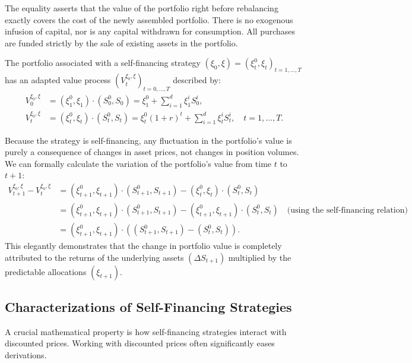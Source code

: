 The equality asserts that the value of the portfolio right before rebalancing exactly covers the cost of the newly assembled portfolio. There is no exogenous infusion of capital, nor is any capital withdrawn for consumption. All purchases are funded strictly by the sale of existing assets in the portfolio.

\begin{definition}
The portfolio associated with a self-financing strategy $(\xi_0, \xi) = (\xi_t^0, \xi_t)_{t=1, \dots, T}$ has an adapted value process $(V_t^{\xi_0, \xi})_{t=0, \dots, T}$ described by:
\begin{align*}
V_0^{\xi_0, \xi} &= \left(\xi_1^0, \xi_1\right) \cdot \left(S_0^0, S_0\right) = \xi_1^0 + \sum_{i=1}^d \xi_1^i S_0^i, \\
V_t^{\xi_0, \xi} &= \left(\xi_t^0, \xi_t\right) \cdot \left(S_t^0, S_t\right) = \xi_t^0(1+r)^t + \sum_{i=1}^d \xi_t^i S_t^i, \quad t=1, \dots, T.
\end{align*}
\end{definition}

Because the strategy is self-financing, any fluctuation in the portfolio's value is purely a consequence of changes in asset prices, not changes in position volumes. We can formally calculate the variation of the portfolio's value from time $t$ to $t+1$:
\begin{align*}
V_{t+1}^{\xi_0, \xi} - V_t^{\xi_0, \xi} &= \left(\xi_{t+1}^0, \xi_{t+1}\right) \cdot \left(S_{t+1}^0, S_{t+1}\right) - \left(\xi_t^0, \xi_t\right) \cdot \left(S_t^0, S_t\right) \\
&= \left(\xi_{t+1}^0, \xi_{t+1}\right) \cdot \left(S_{t+1}^0, S_{t+1}\right) - \left(\xi_{t+1}^0, \xi_{t+1}\right) \cdot \left(S_t^0, S_t\right) \quad \text{(using the self-financing relation)} \\
&= \left(\xi_{t+1}^0, \xi_{t+1}\right) \cdot \left( (S_{t+1}^0, S_{t+1}) - (S_t^0, S_t) \right).
\end{align*}
This elegantly demonstrates that the change in portfolio value is completely attributed to the returns of the underlying assets $(\Delta S_{t+1})$ multiplied by the predictable allocations $(\xi_{t+1})$.

\subsection{Characterizations of Self-Financing Strategies}

A crucial mathematical property is how self-financing strategies interact with discounted prices. Working with discounted prices often significantly eases derivations.

